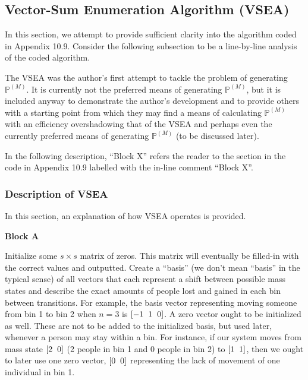 \documentclass{article}
\begin{document}
\subsection{Vector-Sum Enumeration Algorithm (VSEA)}
In this section, we attempt to provide sufficient clarity into the algorithm coded in Appendix 10.9. Consider the following subsection to be a line-by-line analysis of the coded algorithm.

The VSEA was the author's first attempt to tackle the problem of generating $\mathbb{P}^{(M)}$. It is currently not the preferred means of generating $\mathbb{P}^{(M)}$, but it is included anyway to demonstrate the author's development and to provide others with a starting point from which they may find a means of calculating $\mathbb{P}^{(M)}$ with an efficiency overshadowing that of the VSEA and perhaps even the currently preferred means of generating $\mathbb{P}^{(M)}$ (to be discussed later).

In the following description, ``Block X'' refers the reader to the section in the code in Appendix 10.9 labelled with the in-line comment ``Block X''.

\subsubsection{Description of VSEA}
In this section, an explanation of how VSEA operates is provided.

\textbf{Block A}

Initialize some $s \times s$ matrix of zeros. This matrix will eventually be filled-in with the correct values and outputted. Create a ``basis'' (we don't mean ``basis'' in the typical sense) of all vectors that each represent a shift between possible mass states and describe the exact amounts of people lost and gained in each bin between transitions. For example, the basis vector representing moving someone from bin 1 to bin 2 when $n=3$ is $[-1 \hspace{2mm} 1 \hspace{2mm} 0]$. A zero vector ought to be initialized as well. These are not to be added to the initialized basis, but used later, whenever a person may stay within a bin. For instance, if our system moves from mass state $[2 \hspace{2mm} 0]$ (2 people in bin 1 and 0 people in bin 2) to $[1 \hspace{2mm} 1]$, then we ought to later use one zero vector, $[0 \hspace{2mm} 0]$ representing the lack of movement of one individual in bin 1.
\end{document}
